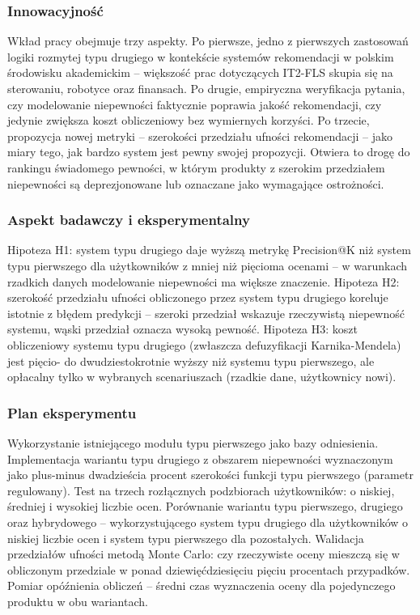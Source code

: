 \documentclass[12pt,a4paper]{article}
\newcommand{\topicsection}[1]{\subsubsection*{#1}}
\begin{document}
\topicsection{Innowacyjność}
Wkład pracy obejmuje trzy aspekty. Po pierwsze, jedno z pierwszych zastosowań logiki rozmytej typu drugiego w kontekście systemów rekomendacji w polskim środowisku akademickim -- większość prac dotyczących IT2-FLS skupia się na sterowaniu, robotyce oraz finansach. Po drugie, empiryczna weryfikacja pytania, czy modelowanie niepewności faktycznie poprawia jakość rekomendacji, czy jedynie zwiększa koszt obliczeniowy bez wymiernych korzyści. Po trzecie, propozycja nowej metryki -- szerokości przedziału ufności rekomendacji -- jako miary tego, jak bardzo system jest pewny swojej propozycji. Otwiera to drogę do rankingu świadomego pewności, w którym produkty z szerokim przedziałem niepewności są deprezjonowane lub oznaczane jako wymagające ostrożności.

\topicsection{Aspekt badawczy i eksperymentalny}
Hipoteza H1: system typu drugiego daje wyższą metrykę Precision@K niż system typu pierwszego dla użytkowników z mniej niż pięcioma ocenami -- w warunkach rzadkich danych modelowanie niepewności ma większe znaczenie. Hipoteza H2: szerokość przedziału ufności obliczonego przez system typu drugiego koreluje istotnie z błędem predykcji -- szeroki przedział wskazuje rzeczywistą niepewność systemu, wąski przedział oznacza wysoką pewność. Hipoteza H3: koszt obliczeniowy systemu typu drugiego (zwłaszcza defuzyfikacji Karnika-Mendela) jest pięcio- do dwudziestokrotnie wyższy niż systemu typu pierwszego, ale opłacalny tylko w wybranych scenariuszach (rzadkie dane, użytkownicy nowi).

\topicsection{Plan eksperymentu}
Wykorzystanie istniejącego modułu typu pierwszego jako bazy odniesienia. Implementacja wariantu typu drugiego z obszarem niepewności wyznaczonym jako plus-minus dwadzieścia procent szerokości funkcji typu pierwszego (parametr regulowany). Test na trzech rozłącznych podzbiorach użytkowników: o niskiej, średniej i wysokiej liczbie ocen. Porównanie wariantu typu pierwszego, drugiego oraz hybrydowego -- wykorzystującego system typu drugiego dla użytkowników o niskiej liczbie ocen i system typu pierwszego dla pozostałych. Walidacja przedziałów ufności metodą Monte Carlo: czy rzeczywiste oceny mieszczą się w obliczonym przedziale w ponad dziewięćdziesięciu pięciu procentach przypadków. Pomiar opóźnienia obliczeń -- średni czas wyznaczenia oceny dla pojedynczego produktu w obu wariantach.
\end{document}
